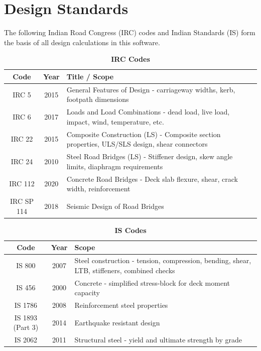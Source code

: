 \documentclass[12pt,a4paper]{report}
\numberwithin{table}{chapter}
\numberwithin{figure}{chapter}
\begin{document}
\section{Design Standards}
\label{sec:design_standards}

The following Indian Road Congress (IRC) codes and Indian Standards (IS) 
form the basis of all design calculations in this software.

\vspace{0.5cm}

\begingroup
\setlength{\tabcolsep}{3.5pt}
\begin{table}[H]
\caption{\textbf{IRC Codes}}
\begin{tabular}{|c|c|p{13cm}|}
\hline
\textbf{Code} & \textbf{Year} & \textbf{Title / Scope} \\ 
\hline
IRC 5 & 2015 & General Features of Design - carriageway widths, kerb, footpath dimensions \\ 
\hline
IRC 6 & 2017 & Loads and Load Combinations - dead load, live load, impact, wind, temperature, etc. \\ 
\hline
IRC 22 & 2015 & Composite Construction (LS) - Composite section properties, ULS/SLS design, shear connectors \\ 
\hline
IRC 24 & 2010 & Steel Road Bridges (LS) - Stiffener design, skew angle limits, diaphragm requirements \\ 
\hline
IRC 112 & 2020 & Concrete Road Bridges - Deck slab flexure, shear, crack width, reinforcement \\ 
\hline
IRC SP 114 & 2018 & Seismic Design of Road Bridges \\ 
\hline
\end{tabular}
\end{table}

\begingroup
\setlength{\tabcolsep}{3.5pt}
\begin{table}[H]
\caption{\textbf{IS Codes}}
\begin{tabular}{|c|c|p{13cm}|}
\hline
\textbf{Code} & \textbf{Year} & \textbf{Scope} \\
\hline
IS 800 & 2007 & Steel construction - tension, compression, bending, shear, LTB, stiffeners, combined checks \\
\hline
IS 456 & 2000 & Concrete - simplified stress-block for deck moment capacity \\
\hline
IS 1786 & 2008 & Reinforcement steel properties \\
\hline
IS 1893 (Part 3) & 2014 & Earthquake resistant design \\
\hline
IS 2062 & 2011 & Structural steel - yield and ultimate strength by grade \\
\hline
\end{tabular}
\end{table}
\end{document}
